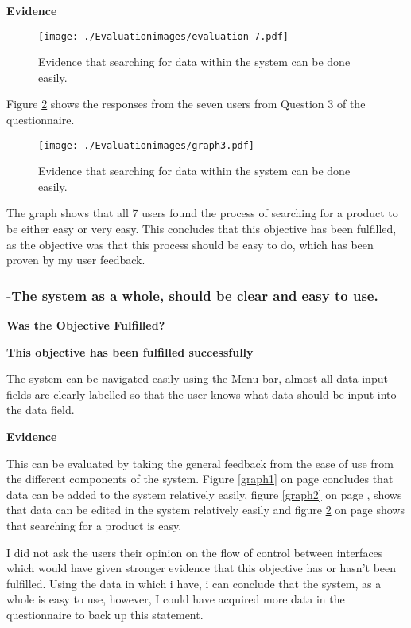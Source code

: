 \textbf{Evidence} \newline

\begin{figure}[H]
\caption{Evidence that searching for data within the system can be done easily.} \label{fig:evaluation-7}
\hfill\texttt{[image: ./Evaluationimages/evaluation-7.pdf]}
\end{figure}

\pagebreak

Figure \ref{graph3} shows the responses from the seven users from Question 3 of the questionnaire.

\begin{figure}[H]
\caption{Evidence that searching for data within the system can be done easily.} \label{graph3}
\hfill\texttt{[image: ./Evaluationimages/graph3.pdf]}
\end{figure}

The graph shows that all 7 users found the process of searching for a product to be either easy or very easy. This concludes that this objective has been fulfilled, as the objective was that this process should be easy to do, which has been proven by my user feedback.


\pagebreak
\subsubsection{-The system as a whole, should be clear and easy to use.}
\textbf{Was the Objective Fulfilled?} \newline

\textbf{\large{This objective has been fulfilled successfully}}

The system can be navigated easily using the Menu bar, almost all data input fields are clearly labelled so that the user knows what data should be input into the data field.

\textbf{Evidence} \newline

This can be evaluated by taking the general feedback from the ease of use from the different components of the system. Figure \ref{graph1} on page \pageref{page1} concludes that data can be added to the system relatively easily, figure \ref{graph2} on page \pageref{graph2}, shows that data can be edited in the system relatively easily and figure \ref{graph3} on page \pageref{graph3} shows that searching for a product is easy.

I did not ask the users their opinion on the flow of control between interfaces which would have given stronger evidence that this objective has or hasn't been fulfilled. Using the data in which i have, i can conclude that the system, as a whole is easy to use, however, I could have acquired more data in the questionnaire to back up this statement. 

